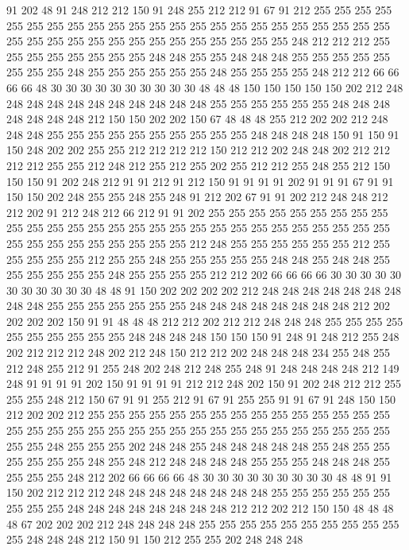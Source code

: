 91 202 48 91 248 212 212 150 91 248 255 212 212 91 67 91 212 255 255 255
255 255 255 255 255 255 255 255 255 255 255 255 255 255 255 255 255 255 255 255
255 255 255 255 255 255 255 255 255 255 255 255 255 255 248 212 212 212 255 255
255 255 255 255 255 255 248 248 255 255 248 248 248 255 255 255 255 255 255 255
255 248 255 255 255 255 255 255 248 255 255 255 255 248 212 212 66 66 66 66
48 30 30 30 30 30 30 30 30 30 30 48 48 48 150 150 150 150 150 202
212 248 248 248 248 248 248 248 248 248 248 248 255 255 255 255 255 255 248 248
248 248 248 248 248 212 150 150 202 202 150 67 48 48 48 255 212 202 202 212
248 248 248 255 255 255 255 255 255 255 255 255 255 248 248 248 248 150 91 150
91 150 248 202 202 255 255 212 212 212 212 150 212 212 202 248 248 202 212 212
212 212 255 255 212 248 212 255 212 255 202 255 212 212 255 248 255 212 150 150
150 91 202 248 212 91 91 212 91 212 150 91 91 91 91 202 91 91 91 67
91 91 150 150 202 248 255 255 248 255 248 91 212 202 67 91 91 202 212 248
248 212 212 202 91 212 248 212 66 212 91 91 202 255 255 255 255 255 255 255
255 255 255 255 255 255 255 255 255 255 255 255 255 255 255 255 255 255 255 255
255 255 255 255 255 255 255 255 255 255 212 248 255 255 255 255 255 255 212 255
255 255 255 255 212 255 255 248 255 255 255 255 255 248 248 255 248 248 255 255
255 255 255 255 248 255 255 255 255 212 212 202 66 66 66 66 30 30 30 30
30 30 30 30 30 30 30 48 48 91 150 202 202 202 202 212 248 248 248 248
248 248 248 248 248 255 255 255 255 255 255 255 248 248 248 248 248 248 248 248
212 202 202 202 202 150 91 91 48 48 48 212 212 202 212 212 248 248 248 255
255 255 255 255 255 255 255 255 255 248 248 248 248 150 150 150 91 248 91 248
212 255 248 202 212 212 212 248 202 212 248 150 212 212 202 248 248 248 234 255
248 255 212 248 255 212 91 255 248 202 248 212 248 255 248 91 248 248 248 248
212 149 248 91 91 91 91 202 150 91 91 91 91 212 212 248 202 150 91 202
248 212 212 255 255 255 248 212 150 67 91 91 255 212 91 67 91 255 255 91
91 67 91 248 150 150 212 202 202 212 255 255 255 255 255 255 255 255 255 255
255 255 255 255 255 255 255 255 255 255 255 255 255 255 255 255 255 255 255 255
255 255 255 255 255 255 248 255 255 255 202 248 248 255 248 248 248 248 248 255
248 255 255 255 255 255 255 248 255 248 212 248 248 248 248 255 255 255 248 248
248 255 255 255 255 248 212 202 66 66 66 66 48 30 30 30 30 30 30 30
30 30 48 48 91 91 150 202 212 212 212 248 248 248 248 248 248 248 248 255
255 255 255 255 255 255 255 255 248 248 248 248 248 248 248 248 212 212 202 212
150 150 48 48 48 48 67 202 202 202 212 248 248 248 248 255 255 255 255 255
255 255 255 255 255 255 248 248 248 212 150 91 150 212 255 255 202 248 248 248
